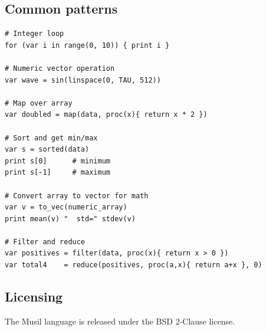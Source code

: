 \documentclass[11pt,a4paper]{article}
\begin{document}
\subsection*{Common patterns}

\begin{lstlisting}
# Integer loop
for (var i in range(0, 10)) { print i }

# Numeric vector operation
var wave = sin(linspace(0, TAU, 512))

# Map over array
var doubled = map(data, proc(x){ return x * 2 })

# Sort and get min/max
var s = sorted(data)
print s[0]      # minimum
print s[-1]     # maximum

# Convert array to vector for math
var v = to_vec(numeric_array)
print mean(v) "  std=" stdev(v)

# Filter and reduce
var positives = filter(data, proc(x){ return x > 0 })
var total4    = reduce(positives, proc(a,x){ return a+x }, 0)
\end{lstlisting}

\subsection*{Licensing}

The Musil language is released under the BSD 2-Clause license.
\end{document}
